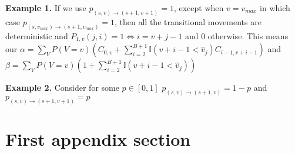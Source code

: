 \documentclass[a4paper,10pt]{article}
\theoremstyle{definition}
\theoremstyle{definition}
\theoremstyle{remark}
\theoremstyle{definition}
\begin{document}
\textbf{Example 1.}
If we use $p_{(s,v) \rightarrow (s+1,v+1)}=1$, except when $v=v_{max}$ in which case $p_{(s,v_{max}) \rightarrow (s+1,v_{max})}=1$, then all the transitional movements are deterministic and $P_{1,v}(j,i)=1 \iff i=v+j-1$ and $0$ otherwise. This means our $\alpha=\sum\limits_{V} P(V=v) (C_{0,v}+ \sum\limits_{i=2}^{B+1} \mathbb{I}(v+i-1 < \hat{v}_{j})C_{i-1,v+i-1})$ and $\beta= \sum\limits_{V} P(V=v) (1+ \sum\limits_{i=2}^{B+1} \mathbb{I}(v+i-1 < \hat{v}_{j}))$


\textbf{Example 2.}
Consider for some $p \in [0,1]$ $p_{(s,v) \rightarrow (s+1,v)}=1-p$ and $p_{(s,v) \rightarrow (s+1,v+1)}=p$


\newpage
\appendix
{}
\appendixpage
\addappheadtotoc
\section{First appendix section}
\end{document}
